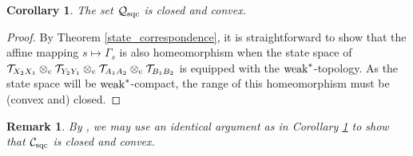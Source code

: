 \documentclass[11pt]{amsart}
\newtheorem{corollary}[theorem]{Corollary}
\newtheorem{remark}[theorem]{Remark}
\newcommand{\cl}[1]{\mathcal{#1}}
\begin{document}
\begin{corollary}\label{qsqc_closed}
The set $\cl{Q}_{\rm sqc}$ is closed and convex.
\end{corollary}
\begin{proof}
By Theorem \ref{state_correspondence}, it is straightforward to show that the affine mapping $s \mapsto \Gamma_{s}$ is also homeomorphism when the state space of $\cl{T}_{X_{2}X_{1}}\otimes_{\rm c} \cl{T}_{Y_{2}Y_{1}}\otimes_{\rm c} \cl{T}_{A_{1}A_{2}}\otimes_{\rm c}\cl{T}_{B_{1}B_{2}}$ is equipped with the ${\rm weak}^{*}$-topology. As the state space will be ${\rm weak}^{*}$-compact, the range of this homeomorphism must be (convex and) closed. 
\end{proof}
\begin{remark}
\rm By \cite[Theorem 7.11]{gt_one}, we may use an identical argument as in Corollary \ref{qsqc_closed} to show that $\cl{C}_{\rm sqc}$ is closed and convex. 
\end{remark} 
\end{document}
